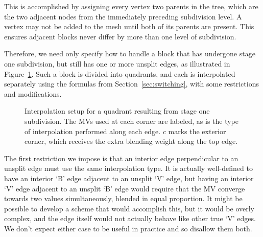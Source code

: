 \documentclass[11pt,letterpaper]{article}
\providecommand{\figinput}[1]{}
\providecommand{\figinput}[1]{}
\begin{document}
This is accomplished by assigning every vertex two parents in the tree, which
 are the two adjacent nodes from the immediately preceding subdivision level.
A vertex may not be added to the mesh until both of its parents are present.
This ensures adjacent blocks never differ by more than one level of
 subdivision.

Therefore, we need only specify how to handle a block that has undergone stage
 one subdivision, but still has one or more unsplit edges, as illustrated in
 Figure~\ref{fig:vbunsplit}.
Such a block is divided into quadrants, and each is interpolated separately
 using the formulas from Section~\ref{sec:switching}, with some restrictions
 and modifications.

\begin{figure}[tb]
\center
\figinput{vbunsplit}
\caption{Interpolation setup for a quadrant resulting from stage one
 subdivision.
The MVs used at each corner are labeled, as is the type of interpolation
 performed along each edge.
$c$ marks the exterior corner, which receives the extra blending weight along
 the top edge.}
\label{fig:vbunsplit}
\end{figure}

The first restriction we impose is that an interior edge perpendicular to an
 unsplit edge must use the same interpolation type.
It is actually well-defined to have an interior `B' edge adjacent to an unsplit
 `V' edge, but having an interior `V' edge adjacent to an unsplit `B' edge
 would require that the MV converge towards two values simultaneously, blended
 in equal proportion.
It might be possible to develop a scheme that would accomplish this, but it
 would be overly complex, and the edge itself would not actually behave like
 other true `V' edges.
We don't expect either case to be useful in practice and so disallow them both.
\end{document}
